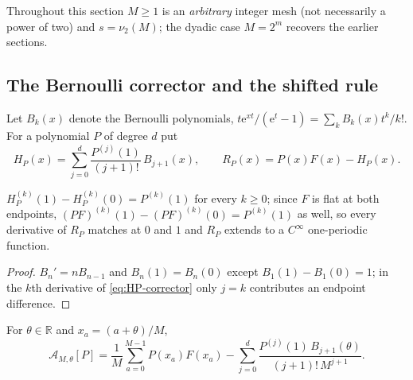 \documentclass[11pt,oneside]{article}
\numberwithin{equation}{section}
\theoremstyle{definition}
\theoremstyle{remark}
\newcommand{\R}{\mathbb R}
\newcommand{\e}{\mathrm e}
\newcommand{\vtwo}{\nu_2}
\begin{document}
Throughout this section $M\ge1$ is an \emph{arbitrary} integer mesh
(not necessarily a power of two) and $s=\vtwo(M)$; the dyadic case
$M=2^{m}$ recovers the earlier sections.

\subsection{The Bernoulli corrector and the shifted rule}

Let $B_k(x)$ denote the Bernoulli polynomials,
$t\e^{xt}/(\e^t-1)=\sum_kB_k(x)t^k/k!$.  For a polynomial $P$ of
degree $d$ put
\begin{equation}
 H_P(x)=\sum_{j=0}^{d}\frac{P^{(j)}(1)}{(j+1)!}\,B_{j+1}(x),
 \qquad
 R_P(x)=P(x)F(x)-H_P(x).
 \label{eq:HP-corrector}
\end{equation}

\begin{lemma}
\label{lem:bern-jump}
$H_P^{(k)}(1)-H_P^{(k)}(0)=P^{(k)}(1)$ for every $k\ge0$; since $F$ is
flat at both endpoints, $(PF)^{(k)}(1)-(PF)^{(k)}(0)=P^{(k)}(1)$ as
well, so every derivative of $R_P$ matches at $0$ and $1$ and $R_P$
extends to a $C^\infty$ one-periodic function.
\end{lemma}

\begin{proof}
$B_n'=nB_{n-1}$ and $B_n(1)=B_n(0)$ except $B_1(1)-B_1(0)=1$; in the
$k$th derivative of \eqref{eq:HP-corrector} only $j=k$ contributes an
endpoint difference.
\end{proof}

\begin{definition}
\label{def:shifted-rule}
For $\theta\in\R$ and $x_a=(a+\theta)/M$,
\begin{equation}
 \mathcal A_{M,\theta}[P]
 =\frac1M\sum_{a=0}^{M-1}P(x_a)F(x_a)
 -\sum_{j=0}^{d}
 \frac{P^{(j)}(1)\,B_{j+1}(\theta)}{(j+1)!\,M^{j+1}}.
 \label{eq:shifted-rule}
\end{equation}
\end{definition}
\end{document}
